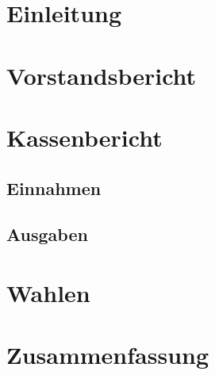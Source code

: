 \documentclass[paper=a6,pagesize=automedia]{scrartcl}
\begin{document}
  \section{Einleitung}
  \section{Vorstandsbericht}
  \section{Kassenbericht}
  \subsection{Einnahmen}
  \subsection{Ausgaben}
  \blindtext\blindtext\blindtext\blindtext
  \blindtext\blindtext\blindtext\blindtext
  \section{Wahlen}
  \section{Zusammenfassung}
\end{document}

